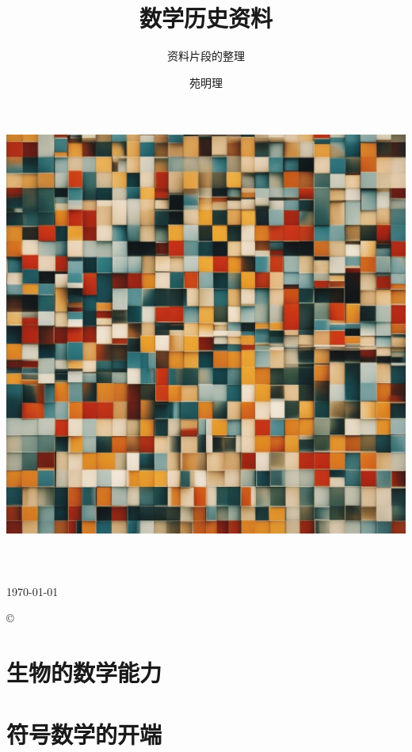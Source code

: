 \documentclass[a4paper,10.5pt]{book}
\title{数学历史资料}
\subtitle{资料片段的整理}
\author{苑明理}
\date{}
\makeatletter
\def\maketitle{
    \begin{titlepage}
        \begin{center}
            \includegraphics[width=6.5in]{images/00_00-Cover.jpeg}\\[5ex]
            {\yihao \bfseries  \@title }\\[10ex]
            {\erhao \bfseries  \@subtitle }\\[10ex]
            {\sanhao  \@author}\\[5ex]
            {\sihao \monthyeardate\today}\\[1ex]
        \end{center}
    \end{titlepage}
    }
\makeatother
\begin{document}
\thispagestyle{empty}
\newpage

\newpage
\thispagestyle{empty}
\maketitle
\begin{center}
    \copyright
\end{center}
\thispagestyle{empty}

\newpage

\setlength{\parindent}{0em}
\setlength{\parskip}{1.2em}



\newpage

\setlength{\parindent}{0em}
\setlength{\parskip}{0em}

\renewcommand\contentsname{目录}
\tableofcontents
\thispagestyle{empty}

\newpage

\setcounter{page}{1} %

\setlength{\parindent}{0em}
\setlength{\parskip}{1.2em}

\part{生物的数学能力}







\part{符号数学的开端}





\begin{appendices}


\end{appendices}



\end{document}
